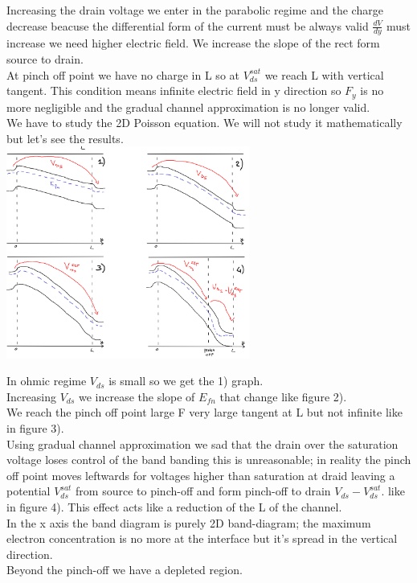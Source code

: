 Increasing the drain voltage we enter in the parabolic regime and the charge decrease beacuse the differential form of the current must be always valid $\frac{dV}{dy}$ must increase we need higher electric field. We increase the slope of the rect form source to drain.\\
At pinch off point we have no charge in L so at $V_{ds}^{sat}$ we reach L with vertical tangent. This condition means infinite electric field in y direction so $F_y$ is no more negligible and the gradual channel approximation is no longer valid.\\
We have to study the 2D Poisson equation. We will not study it mathematically but let's see the results.\\

\centering
\includegraphics[width=0.6\textwidth]{pograph.png}\\
\raggedright

In ohmic regime $V_{ds}$ is small so we get the 1) graph.\\
Increasing $V_{ds}$ we increase the slope of $E_{fn}$ that change like figure 2).\\
We reach the pinch off point large F very large tangent at L but not infinite like in figure 3).\\
Using gradual channel approximation we sad that the drain over the saturation voltage loses control of the band banding this is unreasonable; in reality the pinch off point moves leftwards for voltages higher than saturation at draid leaving a potential $V_{ds}^{sat}$ from source to pinch-off and form pinch-off to drain $V_{ds}-V_{ds}^{sat}$. like in figure 4).
This effect acts like a reduction of the L of the channel.\\
In the x axis the band diagram is purely 2D band-diagram; the maximum electron concentration is no more at the interface but it's spread in the vertical direction.\\ Beyond the pinch-off we have a depleted region.\\

